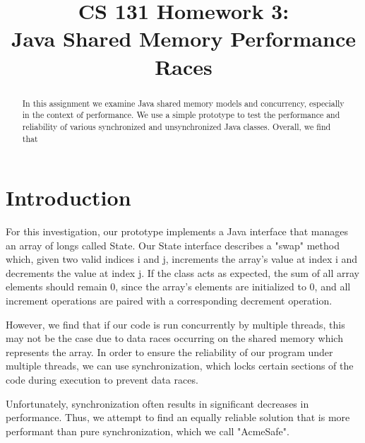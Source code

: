 

\date{}

\title{\Large \bf CS 131 Homework 3:\\
  Java Shared Memory Performance Races }

\maketitle

\begin{abstract}
In this assignment we examine Java shared memory models and concurrency, especially
in the context of performance. We use a simple prototype to test the 
performance and reliability of various synchronized and unsynchronized Java classes.
Overall, we find that   
\end{abstract}
\section{Introduction}
For this investigation, our prototype implements a Java interface that manages 
an array of longs called State. Our State interface describes a "swap" method which, given
two valid indices i and j, increments the array's value at index i and decrements 
the value at index j. If the class acts as expected, the sum of all array elements 
should remain 0, since the array's elements are initialized to 0, and all increment 
operations are paired with a corresponding decrement operation. 

However, we find that if our code is run concurrently by multiple
threads, this may not be the case due to data races occurring on the shared memory which
represents the array. In order to ensure the reliability of our program under 
multiple threads, we can use synchronization, which locks certain sections of the code 
during execution to prevent data races. 

Unfortunately, synchronization often results in 
significant decreases in performance. Thus, we attempt to find an equally reliable solution 
that is more performant than pure synchronization, which we call "AcmeSafe". 

